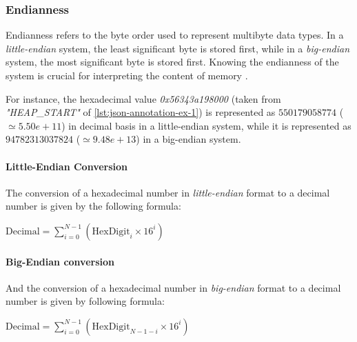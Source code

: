     \subsubsection{Endianness}
    
    Endianness refers to the byte order used to represent multibyte data types. In a \textit{little-endian} system, the least significant byte is stored first, while in a \textit{big-endian} system, the most significant byte is stored first. Knowing the endianness of the system is crucial for interpreting the content of memory \cite{InferenceEndianness17}.
    
    For instance, the hexadecimal value \textit{0x56343a198000} (taken from \textit{"HEAP\_START"} of \ref{lst:json-annotation-ex-1}) is represented as $550179058774$ ($\simeq 5.50e+11$) in decimal basis in a little-endian system, while it is represented as $94782313037824$ ($\simeq 9.48e+13$) in a big-endian system.

    \begin{minipage}{\dimexpr\linewidth-20pt}
        \paragraph{Little-Endian Conversion}
        The conversion of a hexadecimal number in \textit{little-endian} format to a decimal number is given by the following formula:
        \par %
        
        \vspace{2em}  %
        \begin{center}
            $
            \text{Decimal} = \sum_{i=0}^{N-1} \left( \text{HexDigit}_{i} \times 16^{i} \right)
            $
        \end{center}
        \vspace{1em}
    \end{minipage}
    
    \begin{minipage}{\dimexpr\linewidth-20pt}
        \paragraph{Big-Endian conversion}
        And the conversion of a hexadecimal number in \textit{big-endian} format to a decimal number is given by following formula:
        \par %
        
        \vspace{2em}  %
        \begin{center}
            $
            \text{Decimal} = \sum_{i=0}^{N-1} \left( \text{HexDigit}_{N-1-i} \times 16^{i} \right)
            $
        \end{center}
        \vspace{1em}
    \end{minipage}


